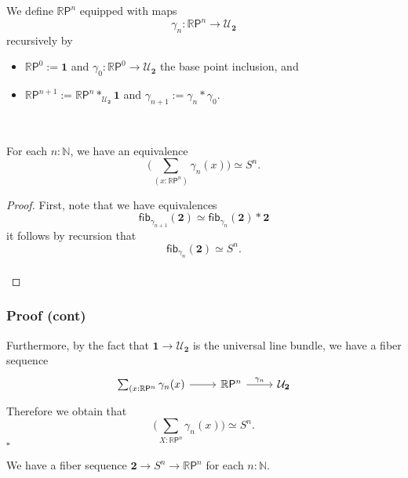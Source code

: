 \documentclass[handout]{beamer}
\newcommand{\N}{\mathbb{N}}
\newcommand{\UU}{\mathcal{U}}
\newcommand{\unit}{\mathbf{1}}
\newcommand{\sphere}[1]{S^{#1}}
\newcommand{\bool}{\mathbf{2}}
\newcommand{\fib}{\mathsf{fib}}
\newcommand{\RP}[1]{\mathbb{R}\mathsf{P}^{#1}}
\begin{document}
\begin{frame}
  \begin{definition}
    We define $\RP{n}$ equipped with maps
    \begin{equation*}
      \gamma_n:\RP{n}\to\UU_\bool
    \end{equation*}
    recursively by
    \begin{itemize}
    \item $\RP{0}:=\unit$ and $\gamma_0:\RP{0}\to\UU_\bool$ the base point inclusion, and
    \item $\RP{n+1}:= \RP{n}\ast_{\UU_\bool}\unit$ and $\gamma_{n+1}:=\gamma_n\ast\gamma_0$. 
    \end{itemize}
  \end{definition}
\end{frame}

\begin{frame}
  \phantom{s}\\[3em]
  \begin{theorem}
    For each $n:\N$, we have an equivalence
    \begin{equation*}
      \Big(\sum_{(x:\RP{n})}\gamma_n(x)\Big)\simeq \sphere{n}.
    \end{equation*}
  \end{theorem}

  \begin{proof}
    First, note that we have equivalences
    \begin{equation*}
      \fib_{\gamma_{n+1}}(\bool)\simeq \fib_{\gamma_n}(\bool)\ast \bool
    \end{equation*}
    it follows by recursion that
    \begin{equation*}
      \fib_{\gamma_n}(\bool)\simeq \sphere{n}.
    \end{equation*}
    \\[10em]
  \end{proof}
\end{frame}

\begin{frame}
  \frametitle{Proof (cont)}
      Furthermore, by the fact that $\unit\to\UU_\bool$ is the universal line bundle, we have a fiber sequence
    \begin{equation*}
      \begin{tikzcd}[ampersand replacement=\&]
        \sum_{(x:\RP{n}}\gamma_n(x) \arrow[r] \& \RP{n} \arrow[r,"\gamma_n"] \& \UU_{\bool}
      \end{tikzcd}
    \end{equation*}
    Therefore we obtain that
    \begin{equation*}
      \Big(\sum_{X:\RP{n}}\gamma_n(x)\Big)\simeq\sphere{n}.
    \end{equation*}
    {}\hfill$\square$

    \begin{corollary}
      We have a fiber sequence $\bool\to\sphere{n}\to\RP{n}$ for each $n:\N$.
    \end{corollary}
\end{frame}
\end{document}
